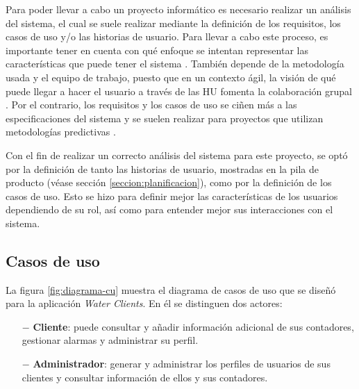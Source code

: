 \documentclass[pdftex,11pt,a4paper]{book}
\begin{document}
Para poder llevar a cabo un proyecto informático es necesario realizar un análisis del sistema, el cual se suele realizar mediante la definición de los requisitos, los casos de uso y/o las historias de usuario. Para llevar a cabo este proceso, es importante tener en cuenta con qué enfoque se intentan representar las características que puede tener el sistema \cite{bib:diferenciasHUCURequisitos}. También depende de la metodología usada y el equipo de trabajo, puesto que en un contexto ágil, la visión de qué puede llegar a hacer el usuario a través de las HU fomenta la colaboración grupal \cite{bib:diferenciasHUCURequisitos}.  Por el contrario, los requisitos y los casos de uso se ciñen más a las especificaciones del sistema y se suelen realizar para proyectos que utilizan metodologías predictivas \cite{bib:diferenciasHUCURequisitos}.


Con el fin de realizar un correcto análisis del sistema para este proyecto, se optó por la definición de tanto las historias de usuario, mostradas en la pila de producto (véase sección \ref{seccion:planificacion}), como por la definición de los casos de uso. Esto se hizo para definir mejor las características de los usuarios dependiendo de su rol, así como para entender mejor sus interacciones con el sistema.

\subsection{Casos de uso}

La figura \ref{fig:diagrama-cu} muestra el diagrama de casos de uso que se diseñó para la aplicación \textit{Water Clients}. En él se distinguen dos actores:

\vspace{-4mm}
\begin{itemize}
\item [$-$] \textbf{Cliente}: puede consultar y añadir información adicional de sus contadores, gestionar alarmas y administrar su perfil. 
\item [$-$] \textbf{Administrador}: generar y administrar los perfiles de usuarios de sus clientes y consultar información de ellos y sus contadores.
\end{itemize}

\newpage
\end{document}
